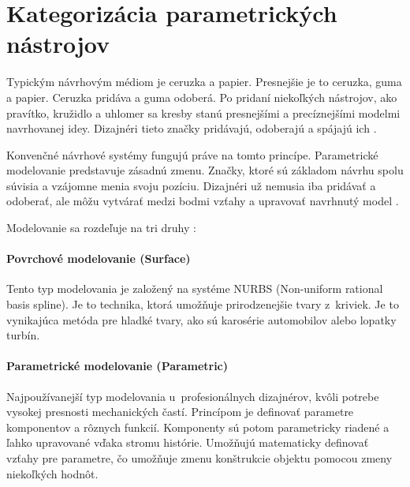 \section{Kategorizácia parametrických nástrojov}
Typickým návrhovým médiom je ceruzka a papier. Presnejšie je to ceruzka, guma a papier. Ceruzka pridáva a guma odoberá. Po pridaní niekoľkých nástrojov, ako pravítko, kružidlo a uhlomer sa kresby stanú presnejšími a precíznejšími modelmi navrhovanej idey. Dizajnéri tieto značky pridávajú, odoberajú a spájajú ich  \cite{woodbury2010elements}.

Konvenčné návrhové systémy fungujú práve na tomto princípe. Parametrické modelovanie predstavuje zásadnú zmenu. Značky, ktoré sú základom návrhu spolu súvisia a vzájomne menia svoju pozíciu. Dizajnéri už nemusia iba pridávať a odoberať, ale môžu vytvárať medzi bodmi vzťahy a upravovať navrhnutý model
\cite{woodbury2010elements}. 








Modelovanie sa rozdeľuje na tri druhy \cite{recrosio_2017}:

\paragraph{Povrchové modelovanie (Surface)}
Tento typ modelovania je založený na systéme NURBS (Non-uniform rational basis spline). Je to technika, ktorá umožňuje prirodzenejšie tvary z~kriviek. Je to vynikajúca metóda pre  hladké tvary, ako sú karosérie automobilov alebo lopatky turbín.

\paragraph{Parametrické modelovanie (Parametric)}
Najpoužívanejší typ modelovania u~profesionálnych dizajnérov, kvôli potrebe vysokej presnosti mechanických častí. Princípom je definovať parametre komponentov a rôznych funkcií. Komponenty sú potom parametricky riadené a ľahko upravované vďaka  stromu histórie. Umožňujú matematicky definovať vzťahy pre parametre, čo umožňuje zmenu konštrukcie objektu pomocou zmeny niekoľkých hodnôt.

